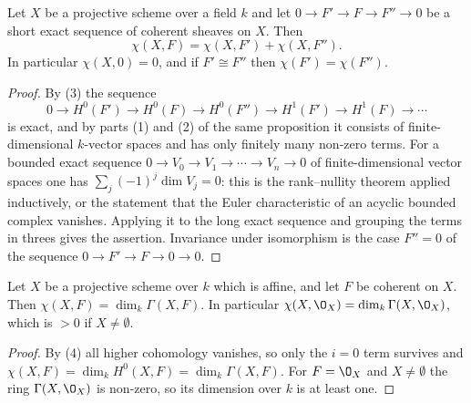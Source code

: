\begin{lemma}\label{lem:deg-euler-additive}
Let $X$ be a projective scheme over a field $k$ and let
$0\to F'\to F\to F''\to0$ be a short exact sequence of coherent sheaves on
$X$.  Then
\[
  \chi(X,F)=\chi(X,F')+\chi(X,F'').
\]
In particular $\chi(X,0)=0$, and if $F'\cong F''$ then $\chi(F')=\chi(F'')$.
\end{lemma}
\begin{proof}
By (3) the sequence
\[
  0\to H^0(F')\to H^0(F)\to H^0(F'')\to H^1(F')\to H^1(F)\to\cdots
\]
is exact, and by parts (1) and (2) of the same proposition it consists of
finite-dimensional $k$-vector spaces and has only finitely many non-zero
terms.  For a bounded exact sequence $0\to V_0\to V_1\to\cdots\to V_n\to0$ of
finite-dimensional vector spaces one has $\sum_j(-1)^j\dim V_j=0$: this is the
rank--nullity theorem applied inductively, or the statement that the Euler
characteristic of an acyclic bounded complex vanishes.  Applying it to the
long exact sequence and grouping the terms in threes gives the assertion.
Invariance under isomorphism is the case $F''=0$ of the sequence
$0\to F'\to F\to0\to0$.
\end{proof}

\begin{lemma}
\label{lem:deg-euler-affine}
Let $X$ be a projective scheme over $k$ which is affine, and let $F$ be
coherent on $X$.  Then $\chi(X,F)=\dim_k\Gamma(X,F)$.  In particular
$\chi(X,\O_X)=\dim_k\Gamma(X,\O_X)$, which is $>0$ if $X\neq\emptyset$.
\end{lemma}
\begin{proof}
By (4) all higher cohomology vanishes, so
only the $i=0$ term survives and $\chi(X,F)=\dim_kH^0(X,F)=\dim_k\Gamma(X,F)$.
For $F=\O_X$ and $X\neq\emptyset$ the ring $\Gamma(X,\O_X)$ is non-zero, so its
dimension over $k$ is at least one.
\end{proof}

